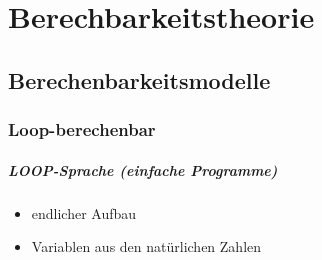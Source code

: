 \documentclass{bschlangaul-theorie}
\begin{document}

\chapter{Berechbarkeitstheorie}

\begin{liQuellen}
\item \cite[Seite 253-340]{hoffmann}
\end{liQuellen}

\section{Berechenbarkeitsmodelle}

%


\subsection{Loop-berechenbar}

\begin{liQuellen}
\item \cite[Seite 7-11]{theo:fs:4}
\item \cite[Seite 254-260]{hoffmann}
\item \cite{wiki:loop}
\end{liQuellen}

\paragraph{LOOP-Sprache (einfache Programme)}

\begin{itemize}
\item endlicher Aufbau
\item Variablen aus den natürlichen Zahlen
\end{itemize}
\end{document}

